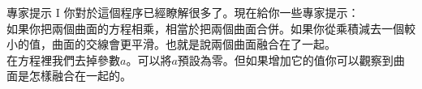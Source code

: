 \begin{surferPage}{專家提示 I}
你對於這個程序已經瞭解很多了。現在給你一些專家提示：\\
\vspace{0.3cm}
如果你把兩個曲面的方程相乘，相當於把兩個曲面合併。如果你從乘積減去一個較小的值，曲面的交線會更平滑。也就是說兩個曲面融合在了一起。\\
\vspace{0.3cm}
在方程裡我們去掉參數$a$。可以將$a$預設為零。但如果增加它的值你可以觀察到曲面是怎樣融合在一起的。
\end{surferPage}
